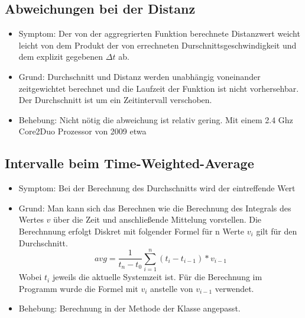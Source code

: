 \documentclass[qualitaetssicherung.tex]{subfiles}
\begin{document}
	\subsection{Abweichungen bei der Distanz} \label{DDIST}
		\begin{itemize}
			\item
			Symptom: Der von der aggregrierten Funktion  berechnete Distanzwert weicht leicht von dem Produkt der von  errechneten Durschnittsgeschwindigkeit und dem explizit gegebenen $\Delta t$ ab.
			\item
			Grund: Durchschnitt und Distanz werden unabhängig voneinander zeitgewichtet berechnet und die Laufzeit der Funktion ist nicht vorhersehbar. Der Durchschnitt ist um ein Zeitintervall verschoben.
			\item
			Behebung: Nicht nötig die abweichung ist relativ gering. Mit einem 2.4 Ghz Core2Duo Prozessor von 2009 etwa 

		\end{itemize}

	\subsection{Intervalle beim Time-Weighted-Average} \label{TWA}
		\begin{itemize}
			\item
			Symptom: Bei der Berechnung des Durchschnitts wird der eintreffende Wert 
			\item
			Grund: Man kann sich das Berechnen wie die Berechnung des Integrals des Wertes $v$ über die Zeit und anschließende Mittelung vorstellen. Die Berechnnung erfolgt Diskret mit folgender Formel für n Werte $v_i$ gilt für den Durchschnitt.
			$$avg = \frac{1}{t_n - t_0} \sum_{i = 1}^{n} (t_i - t_{i-1}) * v_{i-1}$$ Wobei $t_i$ jeweils die aktuelle Systemzeit ist. Für die Berechnung im Programm wurde die Formel mit $v_i$ anstelle von $v_{i-1}$ verwendet.
			\item
			Behebung: Berechnung in der Methode  der Klasse  angepasst.

		\end{itemize}
\end{document}
